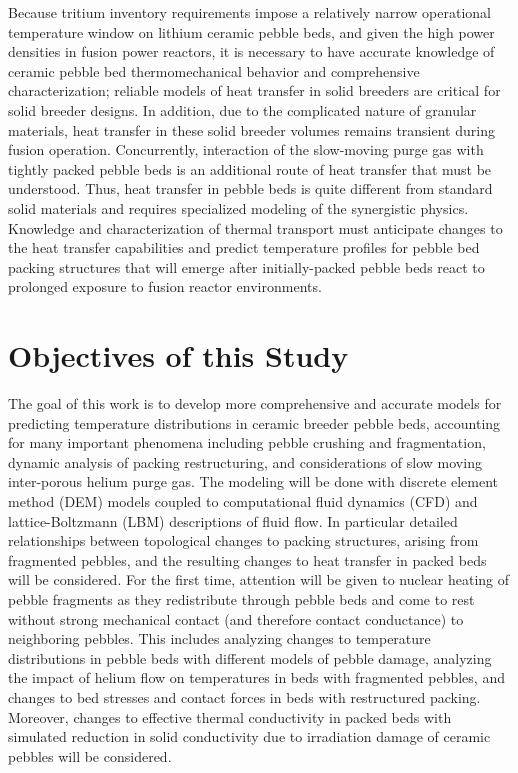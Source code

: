 Because tritium inventory requirements impose a relatively narrow operational temperature window on lithium ceramic pebble beds, and given the high power densities in fusion power reactors, it is necessary to have accurate knowledge of ceramic pebble bed thermomechanical behavior and comprehensive characterization; reliable models of heat transfer in solid breeders are critical for solid breeder designs. In addition, due to the complicated nature of granular materials, heat transfer in these solid breeder volumes remains transient during fusion operation. Concurrently, interaction of the slow-moving purge gas with tightly packed pebble beds is an additional route of heat transfer that must be understood. Thus, heat transfer in pebble beds is quite different from standard solid materials and requires specialized modeling of the synergistic physics. Knowledge and characterization of thermal transport must anticipate changes to the heat transfer capabilities and predict temperature profiles for pebble bed packing structures that will emerge after initially-packed pebble beds react to prolonged exposure to fusion reactor environments.


\section{Objectives of this Study}\label{sec:intro-scope-of-work}
The goal of this work is to develop more comprehensive and accurate models for predicting temperature distributions in ceramic breeder pebble beds, accounting for many important phenomena including pebble crushing and fragmentation, dynamic analysis of packing restructuring, and considerations of slow moving inter-porous helium purge gas. The modeling will be done with discrete element method (DEM) models coupled to computational fluid dynamics (CFD) and lattice-Boltzmann (LBM) descriptions of fluid flow. In particular detailed relationships between topological changes to packing structures, arising from fragmented pebbles, and the resulting changes to heat transfer in packed beds will be considered. For the first time, attention will be given to nuclear heating of pebble fragments as they redistribute through pebble beds and come to rest without strong mechanical contact (and therefore contact conductance) to neighboring pebbles. This includes analyzing changes to temperature distributions in pebble beds with different models of pebble damage, analyzing the impact of helium flow on temperatures in beds with fragmented pebbles, and changes to bed stresses and contact forces in beds with restructured packing. Moreover, changes to effective thermal conductivity in packed beds with simulated reduction in solid conductivity due to irradiation damage of ceramic pebbles will be considered. 

